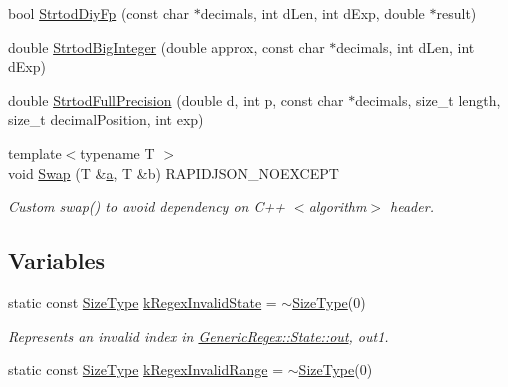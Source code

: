\begin{DoxyCompactItemize}
\item 
bool \mbox{\hyperlink{namespacerapidjson_1_1internal_a2005b2ac382e70120987b7889476d01f}{Strtod\+Diy\+Fp}} (const char $\ast$decimals, int d\+Len, int d\+Exp, double $\ast$result)
\item 
double \mbox{\hyperlink{namespacerapidjson_1_1internal_aeb0c7910094111c91cd31339bf707950}{Strtod\+Big\+Integer}} (double approx, const char $\ast$decimals, int d\+Len, int d\+Exp)
\item 
double \mbox{\hyperlink{namespacerapidjson_1_1internal_afdec628bd595f8aca4ff74ec9e3c88f2}{Strtod\+Full\+Precision}} (double d, int p, const char $\ast$decimals, size\+\_\+t length, size\+\_\+t decimal\+Position, int exp)
\item 
{\footnotesize template$<$typename T $>$ }\\void \mbox{\hyperlink{namespacerapidjson_1_1internal_a68791bde4229e786fa02b0833fee0bef}{Swap}} (T \&\mbox{\hyperlink{namespacerapidjson_a11fce64e721729aaf6be4a485c78f231}{a}}, T \&b) R\+A\+P\+I\+D\+J\+S\+O\+N\+\_\+\+N\+O\+E\+X\+C\+E\+PT
\begin{DoxyCompactList}\small\item\em Custom swap() to avoid dependency on C++ $<$algorithm$>$ header. \end{DoxyCompactList}\end{DoxyCompactItemize}
\subsection*{Variables}
\begin{DoxyCompactItemize}
\item 
static const \mbox{\hyperlink{namespacerapidjson_a44eb33eaa523e36d466b1ced64b85c84}{Size\+Type}} \mbox{\hyperlink{namespacerapidjson_1_1internal_a5e338a291ef3558dbba9ba6eb2b346ea}{k\+Regex\+Invalid\+State}} = $\sim$\mbox{\hyperlink{namespacerapidjson_a44eb33eaa523e36d466b1ced64b85c84}{Size\+Type}}(0)
\begin{DoxyCompactList}\small\item\em Represents an invalid index in \mbox{\hyperlink{structrapidjson_1_1internal_1_1_generic_regex_1_1_state_a6df788d7a28b25c65a20068dfdbe2fe1}{Generic\+Regex\+::\+State\+::out}}, out1. \end{DoxyCompactList}\item 
static const \mbox{\hyperlink{namespacerapidjson_a44eb33eaa523e36d466b1ced64b85c84}{Size\+Type}} \mbox{\hyperlink{namespacerapidjson_1_1internal_a6198792292d27358dbe5595ecaed21d9}{k\+Regex\+Invalid\+Range}} = $\sim$\mbox{\hyperlink{namespacerapidjson_a44eb33eaa523e36d466b1ced64b85c84}{Size\+Type}}(0)
\end{DoxyCompactItemize}


